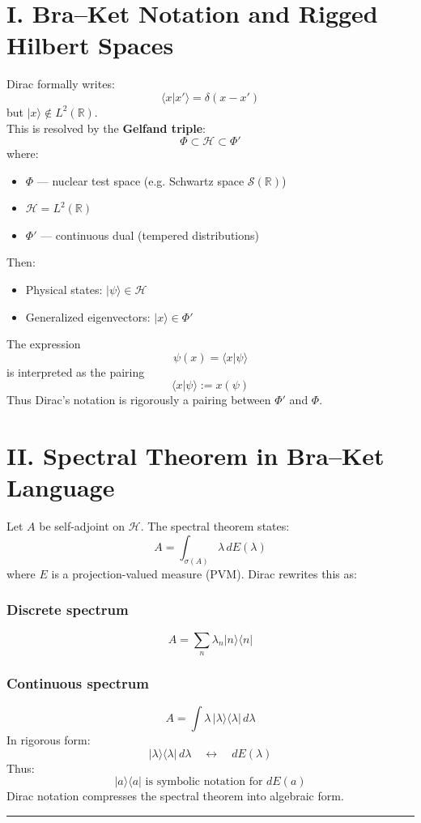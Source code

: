 \documentclass[12pt]{article}
\begin{document}
\section{I. Bra--Ket Notation and Rigged Hilbert
Spaces}\label{i.-braket-notation-and-rigged-hilbert-spaces}
Dirac formally writes:
\[\langle x | x' \rangle = \delta(x-x')\]
but \(|x\rangle \notin L^2(\mathbb{R})\).\\
This is resolved by the \textbf{Gelfand triple}:
\[\Phi \subset \mathcal H \subset \Phi'\]
where:
\begin{itemize}
\item
  \(\Phi\) --- nuclear test space (e.g. Schwartz space
  \(\mathcal S(\mathbb R)\))
\item
  \(\mathcal H = L^2(\mathbb R)\)
\item
  \(\Phi'\) --- continuous dual (tempered distributions)
\end{itemize}
Then:
\begin{itemize}
\item
  Physical states: \(|\psi\rangle \in \mathcal H\)
\item
  Generalized eigenvectors: \(|x\rangle \in \Phi'\)
\end{itemize}
The expression
\[\psi(x) = \langle x|\psi\rangle\]
is interpreted as the pairing
\[\langle x|\psi\rangle := x(\psi)\]
Thus Dirac's notation is rigorously a pairing between \(\Phi'\) and
\(\Phi\).
\section{II. Spectral Theorem in Bra--Ket
Language}\label{ii.-spectral-theorem-in-braket-language}
Let \(A\) be self-adjoint on \(\mathcal H\).
The spectral theorem states:
\[A = \int_{\sigma(A)} \lambda \, dE(\lambda)\]
where \(E\) is a projection-valued measure (PVM).
Dirac rewrites this as:
\subsubsection{Discrete spectrum}\label{discrete-spectrum}
\[A = \sum_n \lambda_n |n\rangle\langle n|\]
\subsubsection{Continuous spectrum}\label{continuous-spectrum}
\[A = \int \lambda \, |\lambda\rangle\langle\lambda|\, d\lambda\]
In rigorous form:
\[|\lambda\rangle\langle\lambda|\, d\lambda \quad \longleftrightarrow \quad dE(\lambda)\]
Thus:
\[\boxed{|a\rangle\langle a| \text{ is symbolic notation for } dE(a)}\]
Dirac notation compresses the spectral theorem into algebraic form.
\begin{center}\rule{0.5\linewidth}{0.5pt}\end{center}
\end{document}
